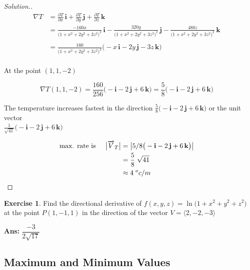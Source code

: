 \documentclass[11pt,a4paper]{article}
\theoremstyle{definition}
\newtheorem{exe}[thm]{Exercise}
\newenvironment{solution}
  {\renewcommand{\qedsymbol}{}\begin{proof}[\textit{Solution}.]}
  {\end{proof}}
\begin{document}
\begin{solution}
\begin{align*}
\nabla T & = \frac{\partial T}{\partial x}\,\textbf{i} + \frac{\partial T}{\partial y}\,\textbf{j} + \frac{\partial T}{\partial z}\,\textbf{k}\\
& = \frac{-160x}{\big(1 + x^2 + 2y^2 + 3z^2\big)^2}\,\textbf{i} - \frac{320y}{\big(1 + x^2 + 2y^2 + 3z^2\big)^2}\,\textbf{j} - \frac{480z}{\big(1 + x^2 + 2y^2 + 3z^2\big)^2}\,\textbf{k}\\\\
& =\frac{160}{\big(1 + x^2 + 2y^2 + 3z^2\big)^2}\big( -x\,\textbf{i}-2y\,\textbf{j} -3z\,\textbf{k}\big)\\
\end{align*}

At the point $(1,1,-2)$ 

$$\nabla T (1,1,-2) = \frac{160}{256}\big(-\textbf{i} - 2\,\textbf{j} + 6\,\textbf{k}\big) = \frac{5}{8}\big(-\textbf{i} - 2\,\textbf{j} + 6\,\textbf{k}\big)                  $$

The temperature increases fastest in the direction $\displaystyle{\frac{5}{8}\big(-\textbf{i} - 2\,\textbf{j} + 6\,\textbf{k}\big)}$ or the unit vector \\$\displaystyle{\frac{1}{\sqrt{41}}\big(-\textbf{i} - 2\,\textbf{j} + 6\,\textbf{k}\big)}$

\begin{align*}
\text{max. rate is}\hspace{0.5cm} \big|\overrightarrow{V}_T\big| & = \big|5/8\big(-\textbf{i} - 2\,\textbf{j} + 6\,\textbf{k}\big)\big|\\
& = \frac{5}{8}\hspace{0.1cm}\sqrt{41}\\
& \approx 4\hspace{0.1cm} ^oc/m\\
\end{align*}
\end{solution}

\begin{exe}


Find the directional derivative of $\displaystyle{f(x,y,z) = \ln\big(1 + x^2 + y^2 + z^2\big)}$ at the point $P(1,-1,1)$ in the direction of the vector $V =\langle 2,-2, -3\rangle$


\textbf{Ans:} $\dfrac{-3}{2\sqrt{17}}$
\end{exe}


{\color[wave]{485}\subsection{Maximum and Minimum Values}}
\end{document}
